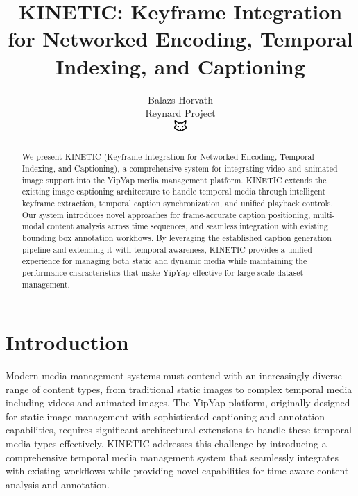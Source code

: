 \documentclass[10pt]{article}
\begin{document}
\title{KINETIC: Keyframe Integration for Networked Encoding, Temporal Indexing, and Captioning}

\author{Balazs Horvath\\
Reynard Project\\
\includegraphics[width=0.5cm]{../../shared-assets/favicon.pdf}}

\maketitle

\begin{abstract}
We present KINETIC (Keyframe Integration for Networked Encoding, Temporal Indexing, and Captioning), a comprehensive system for integrating video and animated image support into the YipYap media management platform. KINETIC extends the existing image captioning architecture to handle temporal media through intelligent keyframe extraction, temporal caption synchronization, and unified playback controls. Our system introduces novel approaches for frame-accurate caption positioning, multi-modal content analysis across time sequences, and seamless integration with existing bounding box annotation workflows. By leveraging the established caption generation pipeline and extending it with temporal awareness, KINETIC provides a unified experience for managing both static and dynamic media while maintaining the performance characteristics that make YipYap effective for large-scale dataset management.
\end{abstract}

\section{Introduction}

Modern media management systems must contend with an increasingly diverse range of content types, from traditional static images to complex temporal media including videos and animated images. The YipYap platform, originally designed for static image management with sophisticated captioning and annotation capabilities, requires significant architectural extensions to handle these temporal media types effectively. KINETIC addresses this challenge by introducing a comprehensive temporal media management system that seamlessly integrates with existing workflows while providing novel capabilities for time-aware content analysis and annotation.
\end{document}
